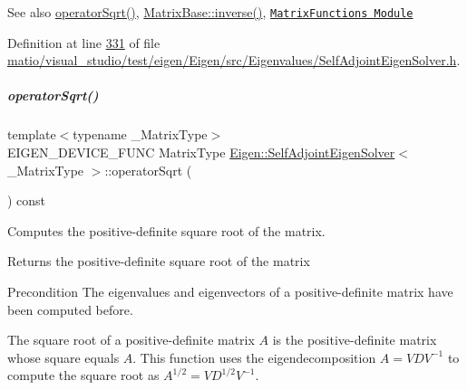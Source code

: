 \begin{DoxySeeAlso}{See also}
\hyperlink{group___eigenvalues___module_a5c5158fd86366081bdabec38112c2c8a}{operator\+Sqrt()}, \hyperlink{group___core___module_a7712eb69e8ea3c8f7b8da1c44dbdeebf}{Matrix\+Base\+::inverse()}, \href{unsupported/group__MatrixFunctions__Module.html}{\tt Matrix\+Functions Module} 
\end{DoxySeeAlso}


Definition at line \hyperlink{matio_2visual__studio_2test_2eigen_2_eigen_2src_2_eigenvalues_2_self_adjoint_eigen_solver_8h_source_l00331}{331} of file \hyperlink{matio_2visual__studio_2test_2eigen_2_eigen_2src_2_eigenvalues_2_self_adjoint_eigen_solver_8h_source}{matio/visual\+\_\+studio/test/eigen/\+Eigen/src/\+Eigenvalues/\+Self\+Adjoint\+Eigen\+Solver.\+h}.

\mbox{\label{group___eigenvalues___module_a5c5158fd86366081bdabec38112c2c8a}} 
\subparagraph{\texorpdfstring{operator\+Sqrt()}{operatorSqrt()}\hspace{0.1cm}{\footnotesize\ttfamily [1/2]}}
{\footnotesize\ttfamily template$<$typename \+\_\+\+Matrix\+Type$>$ \\
E\+I\+G\+E\+N\+\_\+\+D\+E\+V\+I\+C\+E\+\_\+\+F\+U\+NC Matrix\+Type \hyperlink{group___eigenvalues___module_class_eigen_1_1_self_adjoint_eigen_solver}{Eigen\+::\+Self\+Adjoint\+Eigen\+Solver}$<$ \+\_\+\+Matrix\+Type $>$\+::operator\+Sqrt (\begin{DoxyParamCaption}{ }\end{DoxyParamCaption}) const\hspace{0.3cm}{\ttfamily [inline]}}



Computes the positive-\/definite square root of the matrix. 

\begin{DoxyReturn}{Returns}
the positive-\/definite square root of the matrix
\end{DoxyReturn}
\begin{DoxyPrecond}{Precondition}
The eigenvalues and eigenvectors of a positive-\/definite matrix have been computed before.
\end{DoxyPrecond}
The square root of a positive-\/definite matrix $ A $ is the positive-\/definite matrix whose square equals $ A $. This function uses the eigendecomposition $ A = V D V^{-1} $ to compute the square root as $ A^{1/2} = V D^{1/2} V^{-1} $.

